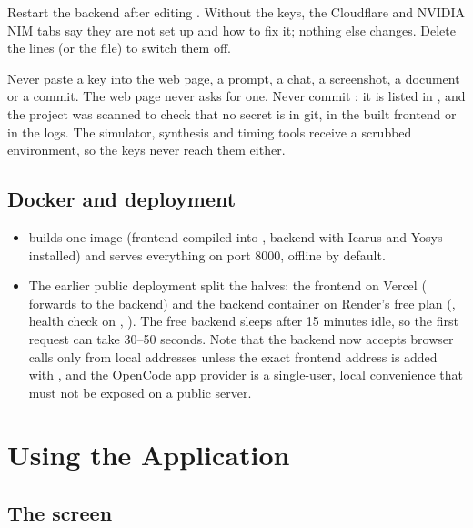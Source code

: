 Restart the backend after editing . Without the keys, the Cloudflare and NVIDIA NIM tabs say they are not set up and how to fix it; nothing else changes. Delete the lines (or the file) to switch them off.

\begin{warnbox}
Never paste a key into the web page, a prompt, a chat, a screenshot, a document or a commit. The web page never asks for one. Never commit : it is listed in , and the project was scanned to check that no secret is in git, in the built frontend or in the logs. The simulator, synthesis and timing tools receive a scrubbed environment, so the keys never reach them either.
\end{warnbox}

\section{Docker and deployment}

\begin{itemize}
  \item {} builds one image (frontend compiled into , backend with Icarus and Yosys installed) and serves everything on port 8000, offline by default.
  \item The earlier public deployment split the halves: the frontend on Vercel ( forwards  to the backend) and the backend container on Render's free plan (, health check on , ). The free backend sleeps after 15 minutes idle, so the first request can take 30--50 seconds. Note that the backend now accepts browser calls only from local addresses unless the exact frontend address is added with , and the OpenCode app provider is a single-user, local convenience that must not be exposed on a public server.
\end{itemize}

\chapter{Using the Application}
\label{ch:usage}

\section{The screen}

